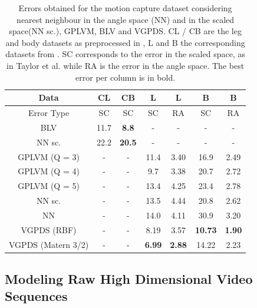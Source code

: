 \documentclass{article} %
\begin{document}
\begin{table}[h]
\caption{
\small{
Errors obtained for the motion capture dataset considering nearest neighbour in the angle space (NN) and in the scaled space(NN sc.), GPLVM, BLV and VGPDS. CL / CB are the leg and body datasets as preprocessed in \cite{Taylor}, L and B the corresponding datasets from \cite{gplvmLarger}. SC corresponds to the error in the scaled space, as in Taylor et al. while RA is the error in the angle space. The best error per column is in bold. }}
\label{motionCaptureTable}
\begin{center}
\begin{tabular}{c||c|c|c|c|c|c}
Data & CL & CB & L & L & B & B \\  \hline
Error Type & SC & SC & SC & RA & SC & RA \\
\hline \hline
BLV 			       & 11.7 & \textbf{8.8} & - & - & - & - \\  \hline
NN sc.   		       & 22.2 & \textbf{20.5} & - & - & - & - \\ \hline
GPLVM (Q = 3)	       & - & - & 11.4 & 3.40 & 16.9 & 2.49 \\ \hline
GPLVM (Q = 4)	       & - & - & 9.7  & 3.38 & 20.7 & 2.72 \\ \hline
GPLVM (Q = 5)	       & - & - & 13.4 & 4.25 & 23.4 & 2.78 \\ \hline
NN sc.  		       & - & - & 13.5 & 4.44 & 20.8 & 2.62 \\ \hline
NN 		 		       & - & - & 14.0 & 4.11 & 30.9 & 3.20 \\ \hline
VGPDS (RBF)        & - & - & 8.19 & 3.57 & \textbf{10.73} & \textbf{1.90} \\ \hline
VGPDS (Matern 3/2) & - & - & \textbf{6.99} & \textbf{2.88} & 14.22 & 2.23 \\
\end{tabular}
\end{center}
\end{table}


\subsection{Modeling Raw High Dimensional Video Sequences}
\end{document}
